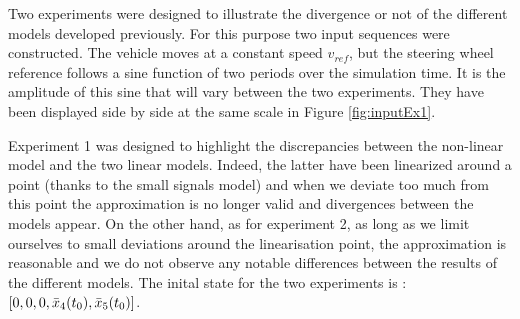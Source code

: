 Two experiments were designed to illustrate the divergence or not of the different models developed previously. For this purpose two input sequences were constructed. The vehicle moves at a constant speed $v_{ref}$, but the steering wheel reference follows a sine function of two periods over the simulation time. It is the amplitude of this sine that will vary between the two experiments. They have been displayed side by side at the same scale in Figure \ref{fig:inputEx1}.

Experiment 1 was designed to highlight the discrepancies between the non-linear model and the two linear models. Indeed, the latter have been linearized around a point (thanks to the small signals model) and when we deviate too much from this point the approximation is no longer valid and divergences between the models appear. 
On the other hand, as for experiment 2, as long as we limit ourselves to small deviations around the linearisation point, the approximation is reasonable and we do not observe any notable differences between the results of the different models.
The inital state for the two experiments is : $[0, 0, 0, \Bar{x}_4(t_0),\Bar{x}_5(t_0)]$.


